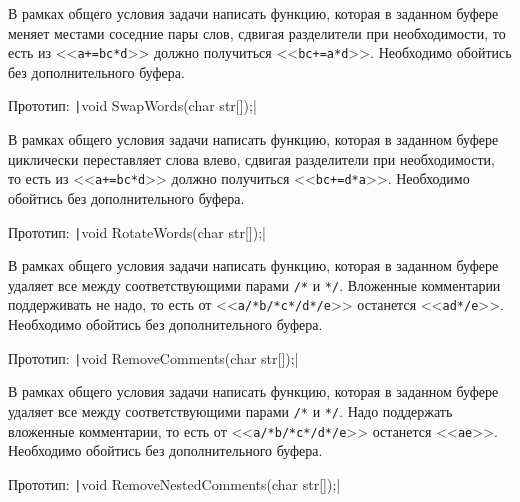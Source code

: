 
\begin{zztask}
В рамках общего условия задачи написать функцию, которая в заданном буфере
меняет местами соседние пары слов, сдвигая разделители при необходимости, то
есть из <<\texttt{a+=bc*d}>> должно получиться <<\texttt{bc+=a*d}>>.
Необходимо обойтись без дополнительного буфера.

Прототип: \texttt|void SwapWords(char str[]);|
\end{zztask}


\begin{zztask}
В рамках общего условия задачи написать функцию, которая в заданном буфере
циклически переставляет слова влево, сдвигая разделители при необходимости,
то есть из <<\texttt{a+=bc*d}>> должно получиться <<\texttt{bc+=d*a}>>.
Необходимо обойтись без дополнительного буфера.

Прототип: \texttt|void RotateWords(char str[]);|
\end{zztask}


\begin{zztask}
В рамках общего условия задачи написать функцию, которая в заданном буфере
удаляет все между соответствующими парами \texttt{/*} и \texttt{*/}.
Вложенные комментарии поддерживать не надо, то есть от 
<<\texttt{a/*b/*c*/d*/e}>> останется <<\texttt{ad*/e}>>. 
Необходимо обойтись без дополнительного буфера.

Прототип: \texttt|void RemoveComments(char str[]);|
\end{zztask}


\begin{zztask}
В рамках общего условия задачи написать функцию, которая в заданном буфере
удаляет все между соответствующими парами \texttt{/*} и \texttt{*/}.
Надо поддержать вложенные комментарии, то есть от 
<<\texttt{a/*b/*c*/d*/e}>> останется <<\texttt{ae}>>. 
Необходимо обойтись без дополнительного буфера.

Прототип: \texttt|void RemoveNestedComments(char str[]);|
\end{zztask}

